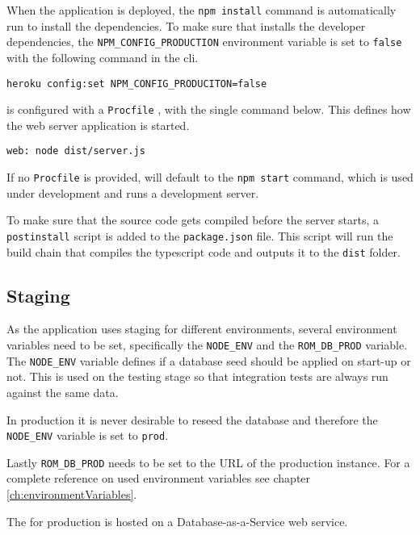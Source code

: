 When the application is deployed, the \verb+npm install+ command is automatically run to install the dependencies.
To make sure that  installs the developer dependencies, the \verb+NPM_CONFIG_PRODUCTION+ environment variable is set to \verb+false+ with the following command in the  \gls{cli}.

\verb+heroku config:set NPM_CONFIG_PRODUCITON=false+

 is configured with a \verb+Procfile+ \citep{documentation:deployment:heroku:procfile}, with the single command below. This defines how the web server application is started.

\verb+web: node dist/server.js+

If no \verb+Procfile+ is provided,  will default to the \verb+npm start+ command, which is used under development and runs a development server.

To make sure that the source code gets compiled before the server starts, a \verb+postinstall+ script is added to the \verb+package.json+ file.
This script will run the  build chain that compiles the \gls{typescript} code and outputs it to the \verb+dist+ folder.

\subsection{Staging}
\label{sec:staging}
As the application uses staging for different environments, several environment variables need to be set, specifically the \verb+NODE_ENV+ and the \verb+ROM_DB_PROD+ variable. 
The \verb+NODE_ENV+ variable defines if a database seed should be applied on start-up or not. 
This is used on the testing stage so that integration tests are always run against the same data.

In production it is never desirable to reseed the database and therefore the \verb+NODE_ENV+ variable is set to \verb+prod+.

Lastly \verb+ROM_DB_PROD+ needs to be set to the URL of the production  instance.
For a complete reference on used environment variables see chapter \ref{ch:environmentVariables}.

The  for production is hosted on  a Database-as-a-Service web service.
